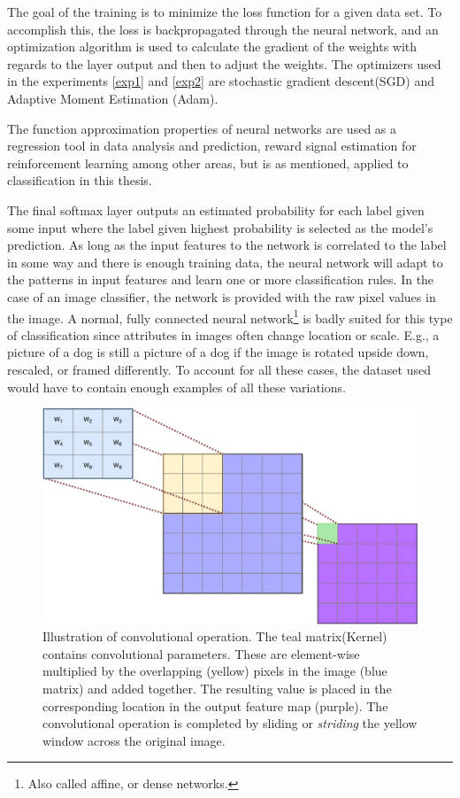 The goal of the training is to minimize the loss function for a given data set. To accomplish this, the loss is backpropagated through the neural network, and an optimization algorithm is used to calculate the gradient of the weights with regards to the layer output and then to adjust the weights. The optimizers used in the experiments \ref{exp1} and \ref{exp2} are stochastic gradient descent(SGD)\cite{sgd} and Adaptive Moment Estimation (Adam)\cite{adam}. 

The function approximation properties of neural networks are used as a regression tool in data analysis and prediction, reward signal estimation for reinforcement learning among other areas, but is as mentioned, applied to classification in this thesis.

The final softmax layer outputs an estimated probability for each label given some input where the label given highest probability is selected as the model's prediction. As long as the input features to the network is correlated to the label in some way and there is enough training data, the neural network will adapt to the patterns in input features and learn one or more classification rules. In the case of an image classifier, the network is provided with the raw pixel values in the image. A normal, fully connected neural network\footnote{Also called affine, or dense networks.} is badly suited for this type of classification since attributes in images often change location or scale. E.g., a picture of a dog is still a picture of a dog if the image is rotated upside down, rescaled, or framed differently. To account for all these cases, the dataset used would have to contain enough examples of all these variations.
\begin{figure}[ht] 
    \centering
    \includegraphics[width=\linewidth]{Chapters/2.Background/figures/convolution.pdf}
    \caption[Illustration of convolutional operation.]{Illustration of convolutional operation. The teal matrix(Kernel) contains convolutional parameters. These are element-wise multiplied by the overlapping (yellow) pixels in the image (blue matrix) and added together. The resulting value is placed in the corresponding location in the output feature map (purple). The convolutional operation is completed by sliding or \textit{striding} the yellow window across the original image.}
    \label{fig:conv}
\end{figure}
